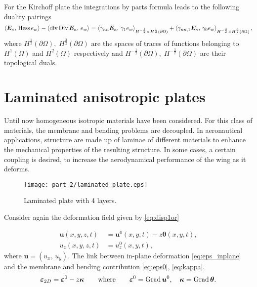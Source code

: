 \begin{remark}\label{rmk:duality_kir}
	For the Kirchoff plate the integrations by parts formula leads to the following duality pairings \cite[Theorem 2.2]{amara2002kir}
	\begin{equation}\label{eq:duality_kir}
	\inner{\bm{E}_\kappa}{\Hess e_w} -\inner{\div\Div\bm{E}_\kappa}{e_w} = \inner[H^{-\frac{1}{2}} \times H^{\frac{1}{2}}(\partial\Omega)]{\gamma_{nn}\bm{E}_\kappa}{\gamma_{1} e_w} + \inner[H^{-\frac{3}{2}} \times H^{\frac{3}{2}}(\partial\Omega)]{\gamma_{nn, 1}\bm{E}_\kappa}{\gamma_{0} e_w},
	\end{equation}
	where $H^{\frac{1}{2}}(\partial\Omega), \; H^{\frac{3}{2}}(\partial\Omega)$ are the spaces of traces of functions belonging to $H^1(\Omega)$ and $H^2(\Omega)$ respectively and $H^{-\frac{1}{2}}(\partial\Omega), \; H^{-\frac{3}{2}}(\partial\Omega)$ are their topological duals.
\end{remark}


\section{Laminated anisotropic plates}\label{sec:lamAnis}


Until now homogeneous isotropic materials have been considered. For this class of materials, the membrane and bending problems are decoupled. In aeronautical applications, structure are made up of laminae of different materials to enhance the mechanical properties of the resulting structure. In some cases, a certain coupling is desired, to increase the aerodynamical performance of the wing as it deforms.

\begin{figure}[tb]
	\centering
	\texttt{[image: part\_2/laminated\_plate.eps]}
	\caption{Laminated plate with 4 layers.}
	\label{fig:laminated_plate}
\end{figure}

Consider again the deformation field given by \eqref{eq:disp1or}

\begin{equation*}\label{eq:dis1or_2}
\begin{aligned}
\bm{u}(x,y,z,t) &= \bm{u}^0(x,y,t) -z \bm{\theta}(x,y,t), \\
u_z(x,y,z,t) &= u_z^0(x,y,t), 
\end{aligned}
\end{equation*}
where $\bm{u} = (u_x, \, u_y)$. The link between in-plane deformation \eqref{eq:eps_inplane} and the membrane and bending contribution \eqref{eq:eps0}, \eqref{eq:kappa}.
\begin{equation}
\bm{\varepsilon}_{2D} = \bm{\varepsilon}^0 - z \bm{\kappa} \where \bm{\varepsilon}^0=\Grad \bm{u}^0, \quad \bm{\kappa} = \Grad \bm{\theta}.
\end{equation}

